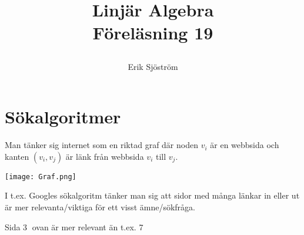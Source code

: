 

\title{
	 Linjär Algebra\\
	 Föreläsning 19
    \author{Erik Sjöström}
}

\maketitle

\section{Sökalgoritmer} %
\label{sec:_}

Man tänker sig internet som en riktad graf där noden $v_i$ är en webbsida och kanten $(v_i, v_j)$ är länk från webbsida $v_i$ till $v_j$.

\begin{center}
	\texttt{[image: Graf.png]}
\end{center}
\noindent
I t.ex. Googles sökalgoritm tänker man sig att sidor med många länkar in eller ut är mer relevanta/viktiga för ett visst ämne/sökfråga.
\begin{Ex}
    Sida \textcircled{3} ovan är mer relevant än t.ex. \textcircled{7}
\end{Ex}

